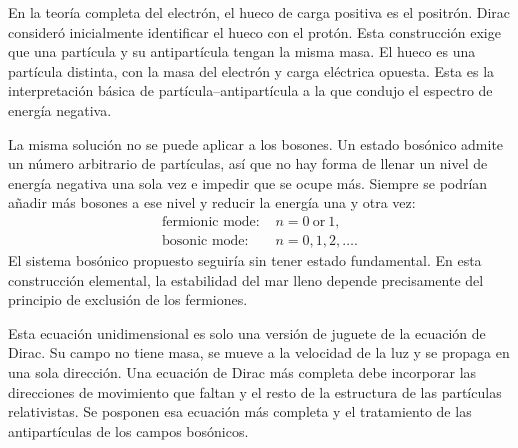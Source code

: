 En la teoría completa del electrón, el hueco de carga positiva es el positrón. Dirac consideró inicialmente identificar el hueco con el protón. Esta construcción exige que una partícula y su antipartícula tengan la misma masa. El hueco es una partícula distinta, con la masa del electrón y carga eléctrica opuesta. Esta es la interpretación básica de partícula--antipartícula a la que condujo el espectro de energía negativa.

La misma solución no se puede aplicar a los bosones. Un estado bosónico admite un número arbitrario de partículas, así que no hay forma de llenar un nivel de energía negativa una sola vez e impedir que se ocupe más. Siempre se podrían añadir más bosones a ese nivel y reducir la energía una y otra vez:
\begin{equation}
\begin{aligned}
\text{fermionic mode: }&n=0\ \text{or}\ 1,\\
\text{bosonic mode: }&n=0,1,2,\ldots .
\end{aligned}
\end{equation}
El sistema bosónico propuesto seguiría sin tener estado fundamental. En esta construcción elemental, la estabilidad del mar lleno depende precisamente del principio de exclusión de los fermiones.

Esta ecuación unidimensional es solo una versión de juguete de la ecuación de Dirac. Su campo no tiene masa, se mueve a la velocidad de la luz y se propaga en una sola dirección. Una ecuación de Dirac más completa debe incorporar las direcciones de movimiento que faltan y el resto de la estructura de las partículas relativistas. Se posponen esa ecuación más completa y el tratamiento de las antipartículas de los campos bosónicos.
